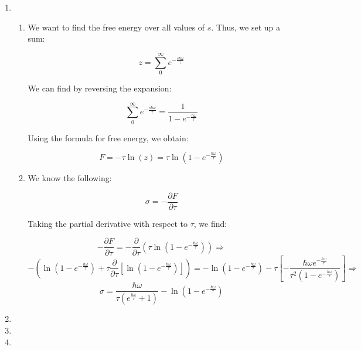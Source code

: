\begin{enumerate}
\begin{enumerate}
      \item 

    \end{enumerate}

  \item 

    \begin{enumerate}

      \item 

        We want to find the free energy over all values of $s$. Thus, we set up a sum:

        $$z=\sum_0^{\infty}e^{-\frac{s\hbar\omega}{\tau}}$$

        We can find by reversing the expansion:

        $$\sum_0^{\infty}e^{-\frac{s\hbar\omega}{\tau}}=\frac{1}{1-e^{-\frac{\hbar\omega}{\tau}}}$$

        Using the formula for free energy, we obtain:

        $$\boxed{F=-\tau\ln\left(  z\right)=\tau\ln\left(  1-e^{-\frac{\hbar\omega}{\tau}}\right)}$$

      \item 

        We know the following:

        $$\sigma=-\frac{\partial F}{\partial\tau}$$

        Taking the partial derivative with respect to $\tau$, we find:

        $$-\frac{\partial F}{\partial\tau}=-\frac{\partial}{\partial\tau}\left( \tau\ln\left( 1-e^{-\frac{\hbar\omega}{\tau}} \right) \right)\Rightarrow$$
        $$-\left(\ln\left( 1-e^{-\frac{\hbar\omega}{\tau}}\right) +\tau\frac{\partial}{\partial \tau}\left[\ln\left( 1-e^{-\frac{\hbar\omega}{\tau}} \right)\right]\right)=-\ln\left( 1-e^{-\frac{\hbar\omega}{\tau}}\right) -\tau\left[-\frac{\hbar\omega e^{-\frac{\hbar\omega}{\tau}}}{\tau^2\left(1-e^{-\frac{\hbar\omega}{\tau}}\right)}\right]\Rightarrow$$
        $$\boxed{\sigma=\frac{\hbar\omega}{\tau\left(e^{\frac{\hbar\omega}{\tau}}+1\right)}-\ln\left( 1-e^{-\frac{\hbar\omega}{\tau}}\right)}$$

    \end{enumerate}

  \item

  \item

  \item


\end{enumerate}
